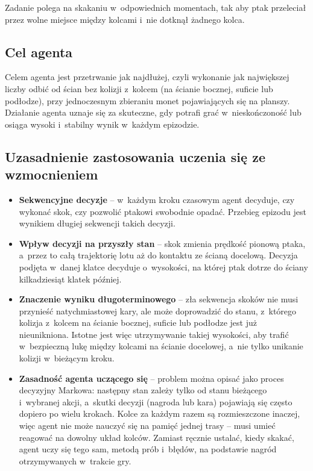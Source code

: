 \documentclass[12pt]{article}
\begin{document}
Zadanie polega na skakaniu w~odpowiednich momentach, tak aby ptak
przeleciał przez wolne miejsce między kolcami i~nie dotknął żadnego
kolca.

\subsection{Cel agenta}

Celem agenta jest przetrwanie jak najdłużej, czyli wykonanie jak największej
liczby odbić od ścian bez kolizji z~kolcem (na ścianie bocznej, suficie lub
podłodze), przy jednoczesnym zbieraniu monet pojawiających się na planszy.
Działanie agenta uznaje się za skuteczne, gdy potrafi grać w~nieskończoność
lub osiąga wysoki i~stabilny wynik w~każdym epizodzie.

\subsection{Uzasadnienie zastosowania uczenia się ze wzmocnieniem}

\begin{itemize}
    \item \textbf{Sekwencyjne decyzje} -- w~każdym kroku czasowym agent
    decyduje, czy wykonać skok, czy pozwolić ptakowi swobodnie opadać.
    Przebieg epizodu jest wynikiem długiej sekwencji takich decyzji.
    \item \textbf{Wpływ decyzji na przyszły stan} -- skok zmienia prędkość
    pionową ptaka, a~przez to całą trajektorię lotu aż do kontaktu ze ścianą
    docelową. Decyzja podjęta w~danej klatce decyduje o~wysokości, na której
    ptak dotrze do ściany kilkadziesiąt klatek później.
    \item \textbf{Znaczenie wyniku długoterminowego} -- zła sekwencja skoków
    nie musi przynieść natychmiastowej kary, ale może doprowadzić do stanu,
    z~którego kolizja z~kolcem na ścianie bocznej, suficie lub podłodze jest
    już nieunikniona. Istotne jest więc utrzymywanie takiej wysokości, aby
    trafić w~bezpieczną lukę między kolcami na ścianie docelowej, a~nie
    tylko unikanie kolizji w~bieżącym kroku.
    \item \textbf{Zasadność agenta uczącego się} -- problem można opisać
    jako proces decyzyjny Markowa: następny stan zależy tylko od stanu
    bieżącego i~wybranej akcji, a~skutki decyzji (nagroda lub kara)
    pojawiają się często dopiero po wielu krokach. Kolce za każdym razem
    są rozmieszczone inaczej, więc agent nie może nauczyć się na pamięć
    jednej trasy -- musi umieć reagować na dowolny układ kolców. Zamiast
    ręcznie ustalać, kiedy skakać, agent uczy się tego sam, metodą prób
    i~błędów, na podstawie nagród otrzymywanych w~trakcie gry.
\end{itemize}
\end{document}
